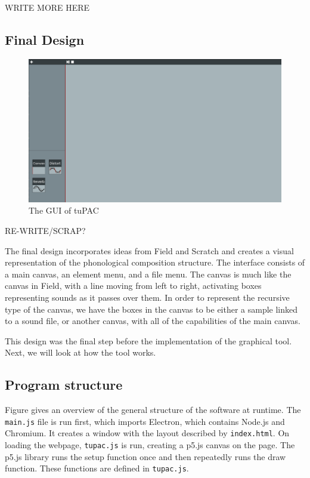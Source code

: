 \documentclass[12pt,a4paper,twoside,openright]{report}
\begin{document}
WRITE MORE HERE

\newpage
\subsection{Final Design}
\begin{figure}[h]
    \centering
    \includegraphics[scale=0.4]{images/tuPAC_GUI.png}
    \caption{The GUI of tuPAC}
    \label{fig:tupac_gui}
\end{figure}
RE-WRITE/SCRAP?

The final design incorporates ideas from Field and Scratch and creates a visual representation of the phonological composition structure. The interface consists of a main canvas, an element menu, and a file menu. The canvas is much like the canvas in Field, with a line moving from left to right, activating boxes representing sounds as it passes over them. In order to represent the recursive type of the canvas, we have the boxes in the canvas to be either a sample linked to a sound file, or another canvas, with all of the capabilities of the main canvas.

This design was the final step before the implementation of the graphical tool. Next, we will look at how the tool works.

\subsection{Program structure}
Figure  gives an overview of the general structure of the software at runtime. The \verb|main.js| file is run first, which imports Electron, which contains Node.js and Chromium. It creates a window with the layout described by \verb|index.html|. On loading the webpage, \verb|tupac.js| is run, creating a p5.js canvas on the page. The p5.js library runs the setup function once and then repeatedly runs the draw function. These functions are defined in \verb|tupac.js|.
\end{document}
